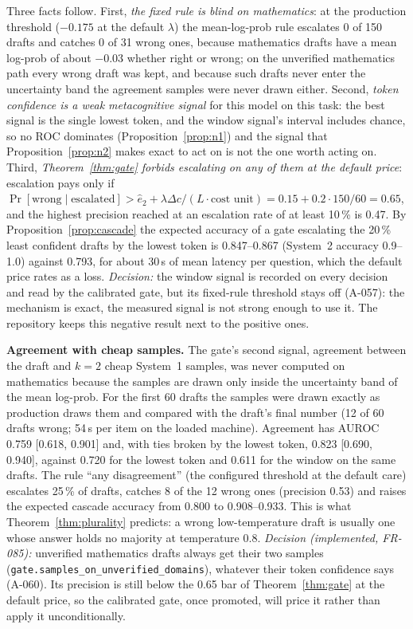 Three facts follow. First, \emph{the fixed rule is blind on mathematics}: at the
production threshold ($-0.175$ at the default $\lambda$) the mean-log-prob rule
escalates 0 of 150 drafts and catches 0 of 31 wrong ones, because mathematics
drafts have a mean log-prob of about $-0.03$ whether right or wrong; on the
unverified mathematics path every wrong draft was kept, and because such drafts
never enter the uncertainty band the agreement samples were never drawn either.
Second, \emph{token confidence is a weak metacognitive signal} for this model on
this task: the best signal is the single lowest token, and the window signal's
interval includes chance, so no ROC dominates (Proposition~\ref{prop:n1}) and
the signal that Proposition~\ref{prop:n2} makes exact to act on is not the one
worth acting on. Third, \emph{Theorem~\ref{thm:gate} forbids escalating on any of
them at the default price}: escalation pays only if
$\Pr[\text{wrong}\mid\text{escalated}]>\hat e_2+\lambda\Delta c/(L\cdot\text{cost unit})
=0.15+0.2\cdot150/60=0.65$, and the highest precision reached at an escalation
rate of at least 10\,\% is 0.47. By Proposition~\ref{prop:cascade} the expected
accuracy of a gate escalating the 20\,\% least confident drafts by the lowest
token is 0.847--0.867 (System~2 accuracy 0.9--1.0) against 0.793, for about 30\,s
of mean latency per question, which the default price rates as a loss.
\emph{Decision:} the window signal is recorded on every decision and read by the
calibrated gate, but its fixed-rule threshold stays off (A-057): the mechanism is
exact, the measured signal is not strong enough to use it. The repository keeps
this negative result next to the positive ones.

\textbf{Agreement with cheap samples.} The gate's second signal, agreement between
the draft and $k=2$ cheap System~1 samples, was never computed on mathematics
because the samples are drawn only inside the uncertainty band of the mean
log-prob. For the first 60 drafts the samples were drawn exactly as production
draws them and compared with the draft's final number (12 of 60 drafts wrong;
54\,s per item on the loaded machine). Agreement has AUROC 0.759 [0.618, 0.901]
and, with ties broken by the lowest token, 0.823 [0.690, 0.940], against 0.720
for the lowest token and 0.611 for the window on the same drafts. The rule
``any disagreement'' (the configured threshold at the default care) escalates
25\,\% of drafts, catches 8 of the 12 wrong ones (precision 0.53) and raises the
expected cascade accuracy from 0.800 to 0.908--0.933. This is what
Theorem~\ref{thm:plurality} predicts: a wrong low-temperature draft is usually
one whose answer holds no majority at temperature 0.8. \emph{Decision
(implemented, FR-085):} unverified mathematics drafts always get their two
samples (\texttt{gate.samples\_on\_unverified\_domains}), whatever their token
confidence says (A-060). Its precision is still below the 0.65 bar of
Theorem~\ref{thm:gate} at the default price, so the calibrated gate, once
promoted, will price it rather than apply it unconditionally.

